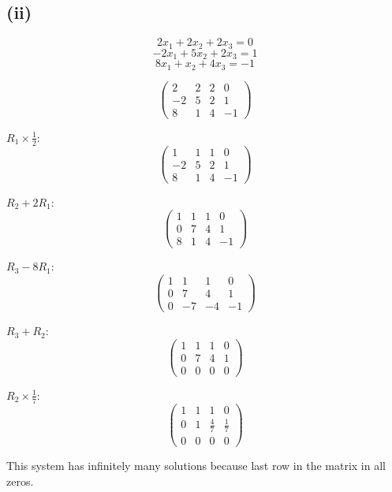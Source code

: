 \subsection*{(ii)}
\[
	2x_1 + 2x_2 + 2x_3 = 0
\]
\[
	-2x_1 + 5x_2 + 2x_3 = 1
\]
\[
	8x_1 + x_2 + 4x_3 = -1
\]

\[
	\begin{pmatrix}
		2  & 2 & 2 & 0  \\
		-2 & 5 & 2 & 1  \\
		8  & 1 & 4 & -1
	\end{pmatrix}
\]

$R_1 \times \frac{1}{2}$:
\[
	\begin{pmatrix}
		1  & 1 & 1 & 0  \\
		-2 & 5 & 2 & 1  \\
		8  & 1 & 4 & -1
	\end{pmatrix}
\]

$R_2 + 2R_1$:
\[
	\begin{pmatrix}
		1 & 1  & 1  & 0  \\
		0 & 7  & 4  & 1  \\
		8  & 1 & 4 & -1
	\end{pmatrix}
\]

$R_3 - 8R_1$:
\[
	\begin{pmatrix}
		1 & 1  & 1  & 0  \\
		0 & 7  & 4  & 1  \\
		0 & -7 & -4 & -1
	\end{pmatrix}
\]

$R_3 + R_2$:
\[
	\begin{pmatrix}
		1 & 1 & 1 & 0 \\
		0 & 7 & 4 & 1 \\
		0 & 0 & 0 & 0
	\end{pmatrix}
\]

$R_2 \times \frac{1}{7}$:
\[
	\begin{pmatrix}
		1 & 1 & 1           & 0           \\
		0 & 1 & \frac{4}{7} & \frac{1}{7} \\
		0 & 0 & 0           & 0
	\end{pmatrix}
\]

This system has infinitely many solutions because last row in the matrix in all zeros.